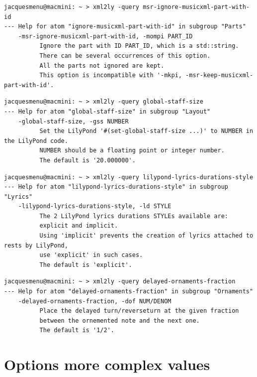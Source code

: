 \begin{lstlisting}[language=Terminal]
jacquesmenu@macmini: ~ > xml2ly -query msr-ignore-musicxml-part-with-id
--- Help for atom "ignore-musicxml-part-with-id" in subgroup "Parts"
    -msr-ignore-musicxml-part-with-id, -mompi PART_ID
          Ignore the part with ID PART_ID, which is a std::string.
          There can be several occurrences of this option.
          All the parts not ignored are kept.
          This option is incompatible with '-mkpi, -msr-keep-musicxml-part-with-id'.
\end{lstlisting}

\begin{lstlisting}[language=Terminal]
jacquesmenu@macmini: ~ > xml2ly -query global-staff-size
--- Help for atom "global-staff-size" in subgroup "Layout"
    -global-staff-size, -gss NUMBER
          Set the LilyPond '#(set-global-staff-size ...)' to NUMBER in the LilyPond code.
          NUMBER should be a floating point or integer number.
          The default is '20.000000'.
\end{lstlisting}

\begin{lstlisting}[language=Terminal]
jacquesmenu@macmini: ~ > xml2ly -query lilypond-lyrics-durations-style
--- Help for atom "lilypond-lyrics-durations-style" in subgroup "Lyrics"
    -lilypond-lyrics-durations-style, -ld STYLE
          The 2 LilyPond lyrics durations STYLEs available are:
          explicit and implicit.
          Using 'implicit' prevents the creation of lyrics attached to rests by LilyPond,
          use 'explicit' in such cases.
          The default is 'explicit'.
\end{lstlisting}

\begin{lstlisting}[language=Terminal]
jacquesmenu@macmini: ~ > xml2ly -query delayed-ornaments-fraction
--- Help for atom "delayed-ornaments-fraction" in subgroup "Ornaments"
    -delayed-ornaments-fraction, -dof NUM/DENOM
          Place the delayed turn/reverseturn at the given fraction
          between the ornemented note and the next one.
          The default is '1/2'.
\end{lstlisting}


\section{Options more complex values}\label{Options more complex values}

